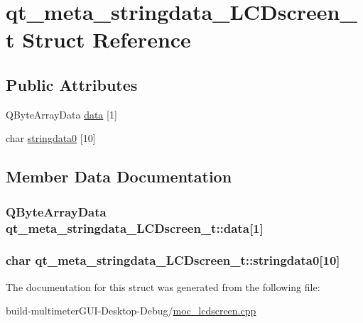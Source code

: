 \hypertarget{structqt__meta__stringdata___l_c_dscreen__t}{\section{qt\-\_\-meta\-\_\-stringdata\-\_\-\-L\-C\-Dscreen\-\_\-t Struct Reference}
\label{structqt__meta__stringdata___l_c_dscreen__t}
}
\subsection*{Public Attributes}
\begin{DoxyCompactItemize}
\item 
Q\-Byte\-Array\-Data \hyperlink{structqt__meta__stringdata___l_c_dscreen__t_a7fb749af1c7bd7f84108b9f93f8e7824}{data} \mbox{[}1\mbox{]}
\item 
char \hyperlink{structqt__meta__stringdata___l_c_dscreen__t_a52cfe342a820525ab1f6e391a1686874}{stringdata0} \mbox{[}10\mbox{]}
\end{DoxyCompactItemize}


\subsection{Member Data Documentation}
\hypertarget{structqt__meta__stringdata___l_c_dscreen__t_a7fb749af1c7bd7f84108b9f93f8e7824}{
\subsubsection[{data}]{\setlength{\rightskip}{0pt plus 5cm}Q\-Byte\-Array\-Data qt\-\_\-meta\-\_\-stringdata\-\_\-\-L\-C\-Dscreen\-\_\-t\-::data\mbox{[}1\mbox{]}}}\label{structqt__meta__stringdata___l_c_dscreen__t_a7fb749af1c7bd7f84108b9f93f8e7824}
\hypertarget{structqt__meta__stringdata___l_c_dscreen__t_a52cfe342a820525ab1f6e391a1686874}{
\subsubsection[{stringdata0}]{\setlength{\rightskip}{0pt plus 5cm}char qt\-\_\-meta\-\_\-stringdata\-\_\-\-L\-C\-Dscreen\-\_\-t\-::stringdata0\mbox{[}10\mbox{]}}}\label{structqt__meta__stringdata___l_c_dscreen__t_a52cfe342a820525ab1f6e391a1686874}


The documentation for this struct was generated from the following file\-:\begin{DoxyCompactItemize}
\item 
build-\/multimeter\-G\-U\-I-\/\-Desktop-\/\-Debug/\hyperlink{moc__lcdscreen_8cpp}{moc\-\_\-lcdscreen.\-cpp}\end{DoxyCompactItemize}
